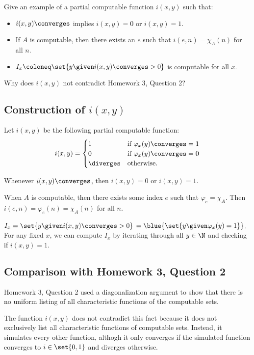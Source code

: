 \begin{problem}
  Give an example of a partial computable function $i(x, y)$ such that:
  \begin{itemize}
    \item $i(x, y) \converges$ implies $i(x, y) = 0$ or $i(x, y) = 1$.
    \item If $A$ is computable, then there exists an $e$ such that
      $i(e, n) = \chi_A(n)$ for all $n$.
    \item $I_x \coloneq \set{ y \given i(x, y) \converges > 0 }$ is computable
      for all $x$.
  \end{itemize}
  Why does $i(x, y)$ not contradict Homework 3, Question 2?

  \begin{answer}
    \subsection*{Construction of $i(x, y)$}
    Let $i(x, y)$ be the following partial computable function:
    \[
      i(x, y) = \begin{cases}
        1 & \text{if } \varphi_x(y) \converges= 1 \\
        0 & \text{if } \varphi_x(y) \converges= 0 \\
        \diverges & \text{otherwise}.
      \end{cases}
    \]

    \begin{enumarabic}
      \item Whenever $i(x, y) \converges$, then $i(x, y) = 0$ or $i(x, y) = 1$.
      \item When $A$ is computable, then there exists some index $e$
        such that $\varphi_e = \chi_A$.
        Then $i(e, n) = \varphi_e(n) = \chi_A(n)$ for all $n$.
      \item $I_x = \set{ y \given i(x, y) \converges > 0 }$
        $=\blue{\set{y \given \varphi_x(y) = 1}}$.
        For any fixed $x$, we can compute $I_x$ by iterating
        through all $y \in \N$ and checking if
        $i(x, y) = 1$.
    \end{enumarabic}

    \subsection*{Comparison with Homework 3, Question 2}

    Homework 3, Question 2 used a diagonalization argument
    to show that there is no uniform listing of all 
    characteristic functions of the computable sets.

    The function $i(x, y)$ does not contradict this fact because
    it does not exclusively list all characteristic functions
    of computable sets.
    Instead, it simulates every other function, althogh it only
    converges if the simulated function converges to $i \in \set{0, 1}$
    and diverges otherwise.
  \end{answer}
\end{problem}
